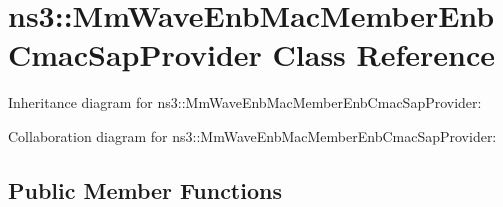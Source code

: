 \hypertarget{classns3_1_1MmWaveEnbMacMemberEnbCmacSapProvider}{}\section{ns3\+:\+:Mm\+Wave\+Enb\+Mac\+Member\+Enb\+Cmac\+Sap\+Provider Class Reference}
\label{classns3_1_1MmWaveEnbMacMemberEnbCmacSapProvider}


Inheritance diagram for ns3\+:\+:Mm\+Wave\+Enb\+Mac\+Member\+Enb\+Cmac\+Sap\+Provider\+:


Collaboration diagram for ns3\+:\+:Mm\+Wave\+Enb\+Mac\+Member\+Enb\+Cmac\+Sap\+Provider\+:
\subsection*{Public Member Functions}
